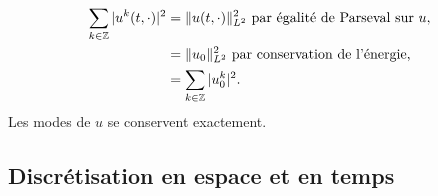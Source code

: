 \begin{align*}
\displaystyle\sum\limits_{k \in \mathbb{Z}} |u^k(t,\cdot)|^2 & = \| u(t,\cdot) \|_{L^2}^2 \text{ par égalité de Parseval sur } u,\\
	& = \| u_0 \|_{L^2}^2 \text{ par conservation de l'énergie,}\\
	& = \displaystyle\sum\limits_{k \in \mathbb{Z}} |u^k_0|^2.
\end{align*}
Les modes de $u$ se conservent exactement.











\subsection{Discrétisation en espace et en temps}

